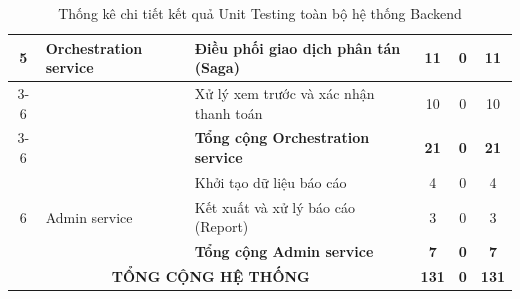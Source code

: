 \begin{table}[H]
\begin{tabular}{|c|l|l|c|c|c|}
\multirow{3}{*}{5} & \multirow{3}{*}{Orchestration service} & Điều phối giao dịch phân tán (Saga) & 11 & 0 & 11 \\ \cline{3-6} 
 & & Xử lý xem trước và xác nhận thanh toán & 10 & 0 & 10 \\ \cline{3-6} 
 & & \textbf{Tổng cộng Orchestration service} & \textbf{21} & \textbf{0} & \textbf{21} \\ \hline

\multirow{3}{*}{6} & \multirow{3}{*}{Admin service} & Khởi tạo dữ liệu báo cáo & 4 & 0 & 4 \\ \cline{3-6} 
 & & Kết xuất và xử lý báo cáo (Report) & 3 & 0 & 3 \\ \cline{3-6} 
 & & \textbf{Tổng cộng Admin service} & \textbf{7} & \textbf{0} & \textbf{7} \\ \hline

\multicolumn{3}{|c|}{\textbf{TỔNG CỘNG HỆ THỐNG}} & \textbf{131} & \textbf{0} & \textbf{131} \\ \hline

\end{tabular}
\caption{Thống kê chi tiết kết quả Unit Testing toàn bộ hệ thống Backend}
\label{tab:full-unit-test-report}
\end{table}